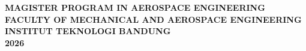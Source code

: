 \begin{titlepage}
\begin{center}
\vfill

\textbf{ \MakeUppercase{MAGISTER PROGRAM IN AEROSPACE ENGINEERING}}\\
\textbf{ \MakeUppercase{FACULTY OF MECHANICAL AND AEROSPACE ENGINEERING}}\\
\textbf{\large \MakeUppercase{INSTITUT TEKNOLOGI BANDUNG}}\\
\textbf{\large 2026}\\
\end{center}
\end{titlepage}
